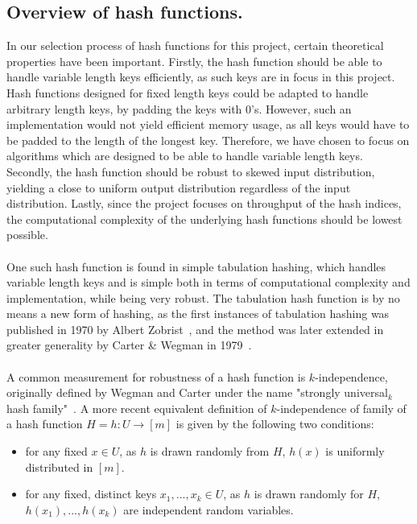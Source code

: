 \documentclass[11pt]{report} %
\begin{document}
\subsection{Overview of hash functions.}
\label{subsec:background_review_of_hashing_algorithms}
In our selection process of hash functions for this project, certain theoretical properties have been important. Firstly, the hash function should be able to handle variable length keys efficiently, as such keys are in focus in this project. Hash functions designed for fixed length keys could be adapted to handle arbitrary length keys, by padding the keys with 0's. However, such an implementation would not yield efficient memory usage, as all keys would have to be padded to the length of the longest key. Therefore, we have chosen to focus on algorithms which are designed to be able to handle variable length keys. \\
Secondly, the hash function should be robust to skewed input distribution, yielding a close to uniform output distribution regardless of the input distribution. Lastly, since the project focuses on throughput of the hash indices, the computational complexity of the underlying hash functions should be lowest possible.\\
\\
One such hash function is found in simple tabulation hashing, which handles variable length keys and is simple both in terms of computational complexity and implementation, while being very robust. The tabulation hash function is by no means a new form of hashing, as the first instances of tabulation hashing was published in 1970 by Albert Zobrist~\cite{Zobrist}, and the method was later extended in greater generality by Carter \& Wegman in 1979~\cite{WC79}. \\
\\
A common measurement for robustness of a hash function is $k$-independence, originally defined by Wegman and Carter under the name "strongly universal$_k$ hash family"~\cite{WC81}. A more recent equivalent definition of $k$-independence of family of a hash function $H = {h : U \rightarrow [m]}$ is given by the following two conditions:
\begin{itemize}[nolistsep]
  \item for any fixed $x \in U$, as $h$ is drawn randomly from $H$, $h(x)$ is uniformly distributed in $[m]$.
  \item for any fixed, distinct keys $x_1,...,x_k \in U$, as $h$ is drawn randomly for $H$, $h(x_1),...,h(x_k)$ are independent random variables.
\end{itemize}
\end{document}

